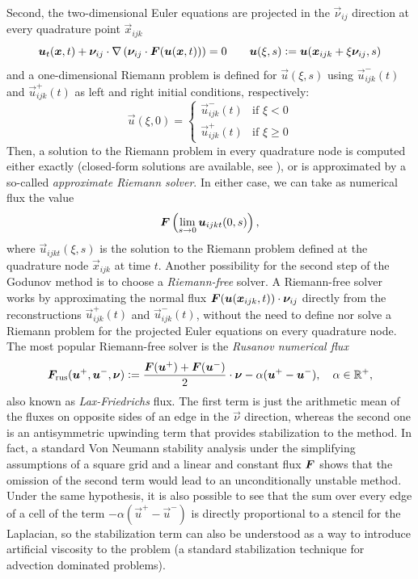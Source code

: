 Second, the two-dimensional Euler equations are projected in the
$\vec{\nu}_{ij}$ direction at every quadrature point $\vec{x}_{ijk}$
\[
\bm{u}_t(\bm{x},t) + \bm{\nu}_{ij} \cdot \nabla \left(
\bm{\nu}_{ij} \cdot \bm{F}(\bm{u}(\bm{x},t)) \right) = 0
\qquad \bm{u}(\xi,s) \vcentcolon= \bm{u}(\bm{x}_{ijk} + \xi \bm{\nu}_{ij},s)
\]
and a one-dimensional Riemann problem is defined for $\vec{u}(\xi,s)$
using $\vec{u}^{-}_{ijk}(t)$ and $\vec{u}^{+}_{ijk}(t)$ as left and right
initial conditions, respectively:
\[
\vec{u}(\xi,0) = 
\begin{cases}
\vec{u}_{ijk}^-(t) & \text{if $\xi < 0$} \\
\vec{u}_{ijk}^+(t) & \text{if $\xi \geq 0$}
\end{cases}
\]
Then, a solution to the Riemann problem in every quadrature node is computed
either exactly (closed-form solutions are available,
see \cite[p.~149]{toro2013riemann}),
or is approximated by a so-called \emph{approximate Riemann solver}.
In either case, we can take as numerical flux the value
\[
\bm{F} \left( \lim_{s \to 0} \bm{u}_{ijkt}(0,s) \right),
\]
where $\vec{u}_{ijkt}(\xi,s)$ is the solution to the Riemann problem defined
at the quadrature node $\vec{x}_{ijk}$ at time $t$.
Another possibility for the second step of the Godunov method is to choose
a \emph{Riemann-free} solver. A Riemann-free solver works by approximating
the normal flux $\bm{F}(\bm{u}(\bm{x}_{ijk},t)) \cdot \bm{\nu}_{ij}$
directly from the reconstructions $\vec{u}^{+}_{ijk}(t)$ and $\vec{u}^{-}_{ijk}(t)$,
without the need to define nor solve a Riemann problem for the projected
Euler equations on every quadrature node.
The most popular Riemann-free solver is the \emph{Rusanov numerical flux}
\begin{equation} \label{eq:rusanov-flux}
\bm{F}_\text{rus}(\bm{u}^{+},\bm{u}^{-},\bm{\nu})
\vcentcolon= \frac{\bm{F}(\bm{u}^{+}) + \bm{F}(\bm{u}^{-})}{2} \cdot \bm{\nu}
	- \alpha(\bm{u}^{+}-\bm{u}^{-}),
\quad \alpha\in\mathbb{R^{+}},
\end{equation}
also known as \emph{Lax-Friedrichs} flux.
The first term is just the arithmetic mean of the fluxes on opposite sides
of an edge in the $\vec{\nu}$ direction, whereas the second one is an
antisymmetric upwinding term that provides stabilization to the method.
In fact, a standard Von Neumann stability analysis under the simplifying
assumptions of a square grid and a linear and constant flux $\bm{F}$
shows that the omission of the second term would lead to an unconditionally
unstable method. Under the same hypothesis, it is also possible to see
that the sum over every edge of a cell of the term $-\alpha(\vec{u}^{+}-\vec{u}^{-})$
is directly proportional to a stencil for the Laplacian, so the stabilization
term can also be understood as a way to introduce artificial viscosity to
the problem (a standard stabilization technique for advection dominated problems).

